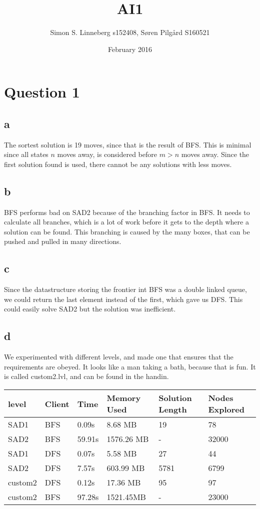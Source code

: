 \documentclass{article}
\title{AI1}
\author{Simon S. Linneberg s152408, Søren Pilgård S160521}
\date{February 2016}
\begin{document}
\maketitle

\section{Question 1}
\subsection{ a }
The sortest solution is 19 moves, since that is the result of BFS. This is minimal since
all states $n$ moves away, is considered before $m > n$ moves away. Since the first
solution found is used, there cannot be any solutions with less moves.

\subsection{ b }
BFS performs bad on SAD2 because of the branching factor in BFS. It needs to calculate
all branches, which is a lot of work before it gets to the depth where a solution can be found.
This branching is caused by the many boxes, that can be pushed and pulled in many directions.\\

\subsection{c}
Since the datastructure storing the frontier int BFS was a double linked queue, we could
return the last element instead of the first, which gave us DFS. This could easily solve
SAD2 but the solution was inefficient.\\

\subsection{d}
We experimented with different levels, and made one that ensures that the requirements are obeyed.
It looks like a man taking a bath, because that is fun. It is called custom2.lvl, and can be found
in the handin.

\begin{tabular}{l|l|l|l|l|l}
  level & Client & Time & Memory Used & Solution Length & Nodes Explored\\\hline
  SAD1 & BFS & 0.09s & 8.68 MB & 19 & 78\\
  SAD2 & BFS & 59.91s & 1576.26 MB  & - & 32000\\
  SAD1 & DFS & 0.07s & 5.58 MB & 27 & 44\\
  SAD2 & DFS & 7.57s & 603.99 MB & 5781 & 6799\\
  custom2 & DFS & 0.12s & 17.36 MB & 95 & 97\\
  custom2 & BFS & 97.28s & 1521.45MB & - & 23000\\
\end{tabular}
\end{document}
